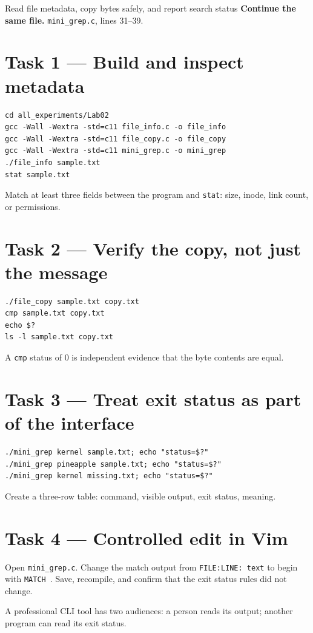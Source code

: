 \begin{labproject}{Read file metadata, copy bytes safely, and report search status}
\noindent\textbf{Continue the same file.} \texttt{mini\_grep.c}, lines 31--39.


\section*{Task 1 --- Build and inspect metadata}
\begin{lstlisting}[style=utpbash]
cd all_experiments/Lab02
gcc -Wall -Wextra -std=c11 file_info.c -o file_info
gcc -Wall -Wextra -std=c11 file_copy.c -o file_copy
gcc -Wall -Wextra -std=c11 mini_grep.c -o mini_grep
./file_info sample.txt
stat sample.txt
\end{lstlisting}
Match at least three fields between the program and \texttt{stat}: size, inode, link count, or permissions.

\section*{Task 2 --- Verify the copy, not just the message}
\begin{lstlisting}[style=utpbash]
./file_copy sample.txt copy.txt
cmp sample.txt copy.txt
echo $?
ls -l sample.txt copy.txt
\end{lstlisting}
A \texttt{cmp} status of 0 is independent evidence that the byte contents are equal.

\section*{Task 3 --- Treat exit status as part of the interface}
\begin{lstlisting}[style=utpbash]
./mini_grep kernel sample.txt; echo "status=$?"
./mini_grep pineapple sample.txt; echo "status=$?"
./mini_grep kernel missing.txt; echo "status=$?"
\end{lstlisting}
Create a three-row table: command, visible output, exit status, meaning.

\section*{Task 4 --- Controlled edit in Vim}
Open \texttt{mini\_grep.c}. Change the match output from \texttt{FILE:LINE: text} to begin with \texttt{MATCH }. Save, recompile, and confirm that the exit status rules did not change.

\begin{keyidea}
A professional CLI tool has two audiences: a person reads its output; another program can read its exit status.
\end{keyidea}


\end{labproject}
